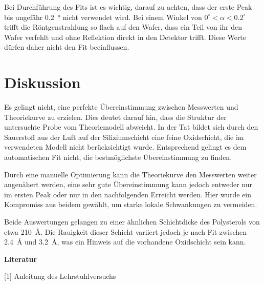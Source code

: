Bei Durchführung des Fits ist es wichtig, darauf zu achten, dass der erste Peak bis ungefähr \SI{0.2}{\degree} nicht verwendet wird. Bei einem Winkel von $0^\circ < \alpha < 0.2^\circ$ trifft die Röntgenstrahlung so flach auf den Wafer, dass ein Teil von ihr den Wafer verfehlt und ohne Reflektion direkt in den Detektor trifft. Diese Werte dürfen daher nicht den Fit beeinflussen.

\section{Diskussion}
Es gelingt nicht, eine perfekte Übereinstimmung zwischen Messwerten und Theoriekurve zu erzielen.
Dies deutet darauf hin, dass die Struktur der untersuchte Probe vom Theoriemodell abweicht. In der Tat bildet sich durch den Sauerstoff aus der Luft auf der Siliziumschicht eine feine Oxidschicht, die im verwendeten Modell nicht berücksichtigt wurde.
Entsprechend gelingt es dem automatischen Fit nicht, die bestmöglichste Übereinstimmung zu finden.

Durch eine manuelle Optimierung kann die Theoriekurve den Messwerten weiter angenähert werden, eine sehr gute Übereinstimmung kann jedoch entweder nur im ersten Peak oder nur in den nachfolgenden Erreicht werden. Hier wurde ein Kompromiss aus beidem gewählt, um starke lokale Schwankungen zu vermeiden.

Beide Auswertungen gelangen zu einer ähnlichen Schichtdicke des Polysterols von etwa \SI{210}{\angstrom}.
Die Rauigkeit dieser Schicht variiert jedoch je nach Fit zwischen \SI{2.4}{\angstrom} und \SI{3.2}{\angstrom}, was ein Hinweis auf die vorhandene Oxidschicht sein kann.



\vspace{2cm}
\textbf{Literatur}

\vspace{0.3cm}
[1] Anleitung des Lehrstuhlversuchs





